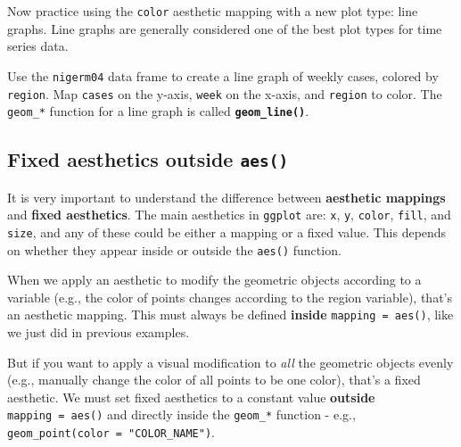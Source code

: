 \documentclass[
  letterpaper,
  DIV=11,
  numbers=noendperiod]{scrreprt}
\begin{document}
Now practice using the \texttt{color} aesthetic mapping with a new plot
type: line graphs. Line graphs are generally considered one of the best
plot types for time series data.

\begin{tcolorbox}[enhanced jigsaw, colframe=quarto-callout-tip-color-frame, rightrule=.15mm, opacityback=0, breakable, coltitle=black, colbacktitle=quarto-callout-tip-color!10!white, bottomrule=.15mm, leftrule=.75mm, toprule=.15mm, arc=.35mm, bottomtitle=1mm, colback=white, left=2mm, opacitybacktitle=0.6, titlerule=0mm, title=\textcolor{quarto-callout-tip-color}{\faLightbulb}\hspace{0.5em}{Practice}, toptitle=1mm]

Use the \texttt{nigerm04} data frame to create a line graph of weekly
cases, colored by \texttt{region}. Map \texttt{cases} on the y-axis,
\texttt{week} on the x-axis, and \texttt{region} to color. The
\texttt{geom\_*} function for a line graph is called
\textbf{\texttt{geom\_line()}}.

\end{tcolorbox}

\hypertarget{fixed-aesthetics-outside-aes}{%
\subsection{\texorpdfstring{Fixed aesthetics outside
\texttt{aes()}}{Fixed aesthetics outside aes()}}\label{fixed-aesthetics-outside-aes}}

It is very important to understand the difference between
\textbf{aesthetic mappings} and \textbf{fixed aesthetics}. The main
aesthetics in \texttt{ggplot} are: \texttt{x}, \texttt{y},
\texttt{color}, \texttt{fill}, and \texttt{size}, and any of these could
be either a mapping or a fixed value. This depends on whether they
appear inside or outside the \texttt{aes()} function.

When we apply an aesthetic to modify the geometric objects according to
a variable (e.g., the color of points changes according to the region
variable), that's an aesthetic mapping. This must always be defined
\textbf{inside} \texttt{mapping\ =\ aes()}, like we just did in previous
examples.

But if you want to apply a visual modification to \emph{all} the
geometric objects evenly (e.g., manually change the color of all points
to be one color), that's a fixed aesthetic. We must set fixed aesthetics
to a constant value \textbf{outside} \texttt{mapping\ =\ aes()} and
directly inside the \texttt{geom\_*} function - e.g.,
\texttt{geom\_point(color\ =\ "COLOR\_NAME")}.
\end{document}
